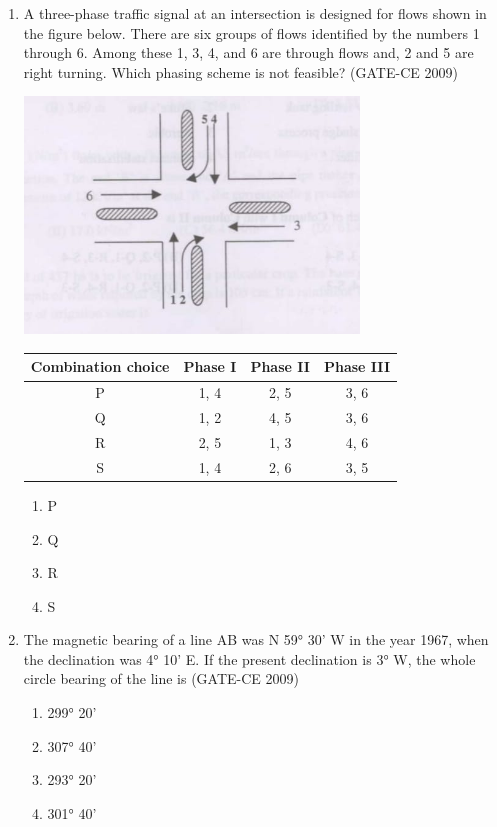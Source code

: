 \documentclass[12pt]{article}
\begin{document}
\begin{enumerate}[label=Q.\arabic*]
    \item A three-phase traffic signal at an intersection is designed for flows shown in the figure below. There are six groups of flows identified by the numbers 1 through 6. Among these 1, 3, 4, and 6 are through flows and, 2 and 5 are right turning. Which phasing scheme is not feasible? (GATE-CE 2009)
    \begin{center}
    \includegraphics[width=0.7\textwidth]{image4.jpg}
    \end{center}
    \begin{tabular}{|c|c|c|c|}
    \hline
    Combination choice & Phase I & Phase II & Phase III \\
    \hline
    P & 1, 4 & 2, 5 & 3, 6 \\
    Q & 1, 2 & 4, 5 & 3, 6 \\
    R & 2, 5 & 1, 3 & 4, 6 \\
    S & 1, 4 & 2, 6 & 3, 5 \\
    \hline
    \end{tabular}
    \begin{enumerate}[label=(\Alph*)]
        \item P 
        \item Q 
        \item R 
        \item S
    \end{enumerate}
    
    \item The magnetic bearing of a line AB was N 59° 30' W in the year 1967, when the declination was 4° 10' E. If the present declination is 3° W, the whole circle bearing of the line is (GATE-CE 2009)
    \begin{enumerate}[label=(\Alph*)]
        \item 299° 20' 
        \item 307° 40' 
        \item 293° 20' 
        \item 301° 40'
    \end{enumerate}
    

\end{enumerate}
\end{document}
